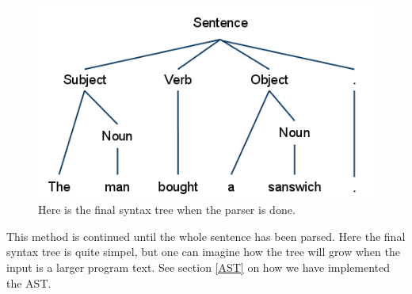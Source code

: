 \begin{figure}[H]
\begin{center}
\includegraphics[scale=0.5]{Images/parsingexample/AST5.png}
\end{center}
\caption{Here is the final syntax tree when the parser is done.}
\end{figure}

This method is continued until the whole sentence has been parsed. Here the final syntax tree is quite simpel, but one can imagine how the tree will grow when the input is a larger program text. See section \ref{AST} on how we have implemented the AST.
